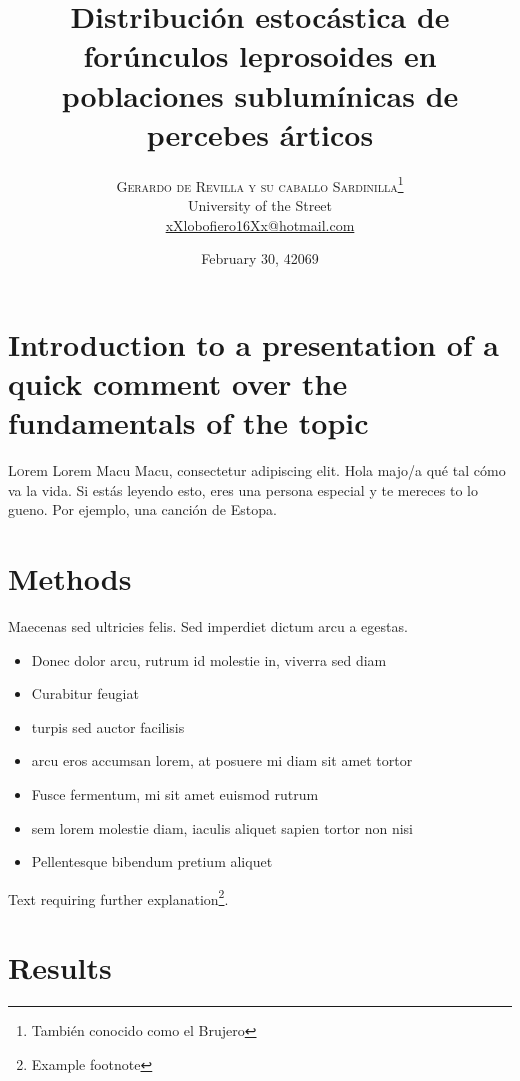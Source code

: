 \documentclass[twoside,twocolumn]{article}
\title{Distribución estocástica de forúnculos leprosoides en poblaciones sublumínicas de percebes árticos} %
\author{%
\textsc{Gerardo de Revilla y su caballo Sardinilla}\thanks{También conocido como el Brujero} \\[1ex] %
\normalsize University of the Street \\ %
\normalsize \href{mailto:lobofiero16@hotmail.com}{xXlobofiero16Xx@hotmail.com} %
}
\date{February 30, 42069}
\begin{document}
\maketitle


\section{Introduction to a presentation of a quick comment over the fundamentals of the topic}

\lettrine[nindent=0em,lines=3]{L} orem Lorem Macu Macu, consectetur adipiscing elit.
\blindtext %
Hola majo/a qué tal cómo va la vida. Si estás leyendo esto, eres una persona especial y te 
mereces to lo gueno. Por ejemplo, una canción de Estopa.
\blindtext %


\section{Methods}

Maecenas sed ultricies felis. Sed imperdiet dictum arcu a egestas. 
\begin{itemize}
\item Donec dolor arcu, rutrum id molestie in, viverra sed diam
\item Curabitur feugiat
\item turpis sed auctor facilisis
\item arcu eros accumsan lorem, at posuere mi diam sit amet tortor
\item Fusce fermentum, mi sit amet euismod rutrum
\item sem lorem molestie diam, iaculis aliquet sapien tortor non nisi
\item Pellentesque bibendum pretium aliquet
\end{itemize}
\blindtext %

Text requiring further explanation\footnote{Example footnote}.


\section{Results}
\end{document}
